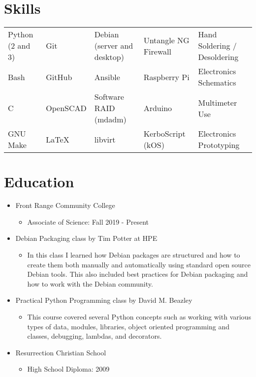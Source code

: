 \documentclass[letterpaper,10pt]{article}
\begin{document}

    \section*{Skills}
        \begin{tabular}{lllll}
            Python (2 and 3) & Git      & Debian (server and desktop) & Untangle NG Firewall & Hand Soldering / Desoldering \\
            Bash             & GitHub   & Ansible                     & Raspberry Pi         & Electronics Schematics \\
            C                & OpenSCAD & Software RAID (mdadm)       & Arduino              & Multimeter Use \\
            GNU Make         & \LaTeX   & libvirt                     & KerboScript (kOS)    & Electronics Prototyping \\
        \end{tabular}

    \section*{Education}
        \begin{itemize}
            \item Front Range Community College
            \begin{itemize}
                \item Associate of Science: Fall 2019 - Present
            \end{itemize}
            \item Debian Packaging class by Tim Potter at HPE
            \begin{itemize}
                \item In this class I learned how Debian packages are structured and how to create them both manually and automatically using standard open source Debian tools. This also included best practices for Debian packaging and how to work with the Debian community.
            \end{itemize}
            \item Practical Python Programming class by David M. Beazley
            \begin{itemize}
                \item This course covered several Python concepts such as working with various types of data, modules, libraries, object oriented programming and classes, debugging, lambdas, and decorators.
            \end{itemize}
            \item Resurrection Christian School
            \begin{itemize}
                \item High School Diploma: 2009
            \end{itemize}
        \end{itemize}
\end{document}
